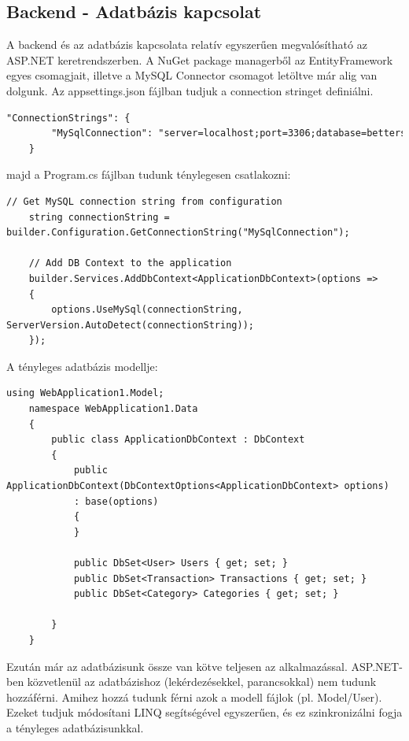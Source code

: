 \subsection{Backend - Adatbázis kapcsolat}
A backend és az adatbázis kapcsolata relatív egyszerűen megvalósítható az ASP.NET keretrendszerben.
A NuGet package managerből az EntityFramework egyes csomagjait,
illetve a MySQL Connector csomagot letöltve már alig van
dolgunk. Az appsettings.json fájlban tudjuk a connection
stringet definiálni.

\begin{lstlisting}[language={HTML}]
	"ConnectionStrings": {
		"MySqlConnection": "server=localhost;port=3306;database=betterspend;user=root;password=<<password>>;"
	}
\end{lstlisting}

majd a Program.cs fájlban tudunk ténylegesen csatlakozni:

\begin{lstlisting}[language={[Sharp]C}]
	// Get MySQL connection string from configuration
	string connectionString = builder.Configuration.GetConnectionString("MySqlConnection");
	
	// Add DB Context to the application
	builder.Services.AddDbContext<ApplicationDbContext>(options =>
	{
		options.UseMySql(connectionString, ServerVersion.AutoDetect(connectionString));
	});
\end{lstlisting}

A tényleges adatbázis modellje:

\begin{lstlisting}[language={[Sharp]C}]
	using WebApplication1.Model;
	namespace WebApplication1.Data
	{
		public class ApplicationDbContext : DbContext
		{
			public ApplicationDbContext(DbContextOptions<ApplicationDbContext> options)
			: base(options)
			{
			}
			
			public DbSet<User> Users { get; set; }
			public DbSet<Transaction> Transactions { get; set; }
			public DbSet<Category> Categories { get; set; }
			
		}
	}
\end{lstlisting}

Ezután már az adatbázisunk össze van kötve teljesen az alkalmazással. ASP.NET-ben közvetlenül az adatbázishoz (lekérdezésekkel, parancsokkal) nem tudunk hozzáférni. Amihez hozzá tudunk férni azok a modell fájlok (pl. Model/User). Ezeket tudjuk módosítani LINQ segítségével egyszerűen, és ez szinkronizálni fogja
a tényleges adatbázisunkkal.

